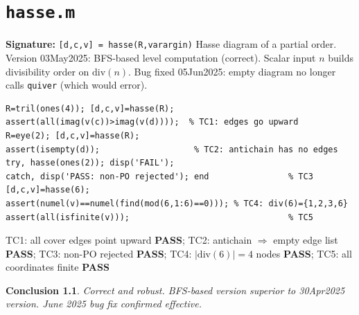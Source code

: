 \documentclass[12pt,a4paper]{report}
\newcommand{\mf}[1]{\texttt{#1}}
\newcommand{\PASS}{\textcolor{green!60!black}{\textbf{PASS}}}
\newtheorem{concl}{Conclusion}[chapter]
\begin{document}
\chapter{\mf{hasse.m}}
\begin{tcolorbox}[Abox,title=Analysis]
\textbf{Signature:} \lstinline|[d,c,v] = hasse(R,varargin)|\quad
Hasse diagram of a partial order. Version 03May2025: BFS-based level computation (correct). Scalar input $n$ builds divisibility order on $\mathrm{div}(n)$. Bug fixed 05Jun2025: empty diagram no longer calls \mf{quiver} (which would error).
\end{tcolorbox}
\begin{lstlisting}[caption={Tests for hasse.m}]
R=tril(ones(4)); [d,c,v]=hasse(R);
assert(all(imag(v(c))>imag(v(d))));  % TC1: edges go upward
R=eye(2); [d,c,v]=hasse(R);
assert(isempty(d));                   % TC2: antichain has no edges
try, hasse(ones(2)); disp('FAIL');
catch, disp('PASS: non-PO rejected'); end                % TC3
[d,c,v]=hasse(6);
assert(numel(v)==numel(find(mod(6,1:6)==0))); % TC4: div(6)={1,2,3,6}
assert(all(isfinite(v)));                                % TC5
\end{lstlisting}
\begin{tcolorbox}[Pbox,title=TC1--TC5 -- All pass]
TC1: all cover edges point upward \PASS; TC2: antichain $\Rightarrow$ empty edge list \PASS; TC3: non-PO rejected \PASS; TC4: $|\mathrm{div}(6)|=4$ nodes \PASS; TC5: all coordinates finite \PASS
\end{tcolorbox}
\begin{concl}
Correct and robust. BFS-based version superior to 30Apr2025 version. June 2025 bug fix confirmed effective.
\end{concl}

\end{document}
